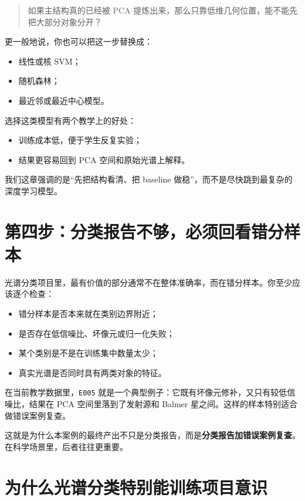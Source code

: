 \begin{quote}
如果主结构真的已经被 PCA 提炼出来，那么只靠低维几何位置，能不能先把大部分对象分开？
\end{quote}

更一般地说，你也可以把这一步替换成：

\begin{itemize}
    \item 线性或核 SVM；
    \item 随机森林；
    \item 最近邻或最近中心模型。
\end{itemize}

选择这类模型有两个教学上的好处：

\begin{itemize}
    \item 训练成本低，便于学生反复实验；
    \item 结果更容易回到 PCA 空间和原始光谱上解释。
\end{itemize}

我们这章强调的是“先把结构看清、把 baseline 做稳”，而不是尽快跳到最复杂的深度学习模型。

\section{第四步：分类报告不够，必须回看错分样本}

光谱分类项目里，最有价值的部分通常不在整体准确率，而在错分样本。你至少应该逐个检查：

\begin{itemize}
    \item 错分样本是否本来就在类别边界附近；
    \item 是否存在低信噪比、坏像元或归一化失败；
    \item 某个类别是不是在训练集中数量太少；
    \item 真实光谱是否同时具有两类对象的特征。
\end{itemize}

在当前教学数据里，\texttt{E005} 就是一个典型例子：它既有坏像元修补，又只有较低信噪比，结果在 PCA 空间里落到了发射源和 Balmer 星之间。这样的样本特别适合做错误案例复查。

这就是为什么本案例的最终产出不只是分类报告，而是\textbf{分类报告加错误案例复查}。在科学场景里，后者往往更重要。

\section{为什么光谱分类特别能训练项目意识}

